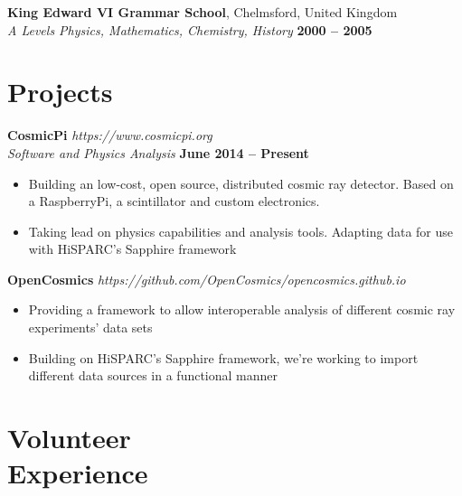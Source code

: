 \documentclass[margin,line]{resume}
\begin{document}
\begin{resume}
    \textbf{King Edward VI Grammar School}, Chelmsford, United Kingdom  \vspace{1mm}\\\vspace{1mm}%
    \textsl{A Levels Physics, Mathematics, Chemistry, History} \hfill \textbf{2000 -- 2005}\vspace{-3mm}\\\vspace{-1mm}%
\vspace{-1.5mm}

    \section{\mysidestyle Projects}


    \textbf{CosmicPi}  \hfill \textsl{https://www.cosmicpi.org}\\\vspace{1mm}%
    \textsl{Software and Physics Analysis} \hfill \textbf{June 2014 -- Present}\\
    \begin{itemize}
    \item{Building an low-cost, open source, distributed cosmic ray detector. Based on a RaspberryPi, a scintillator and custom electronics.}
    \item{Taking lead on physics capabilities and analysis tools. Adapting data for use with HiSPARC's Sapphire framework}
    \end{itemize}


    \textbf{OpenCosmics} \hfill \textsl{https://github.com/OpenCosmics/opencosmics.github.io}\\\vspace{1mm}%
    \begin{itemize}
    \item{Providing a framework to allow interoperable analysis of different cosmic ray experiments' data sets}
    \item{Building on HiSPARC's Sapphire framework, we're working to import different data sources in a functional manner}
    \end{itemize}


    \section{\mysidestyle Volunteer\\Experience}



\end{resume}
\end{document}
